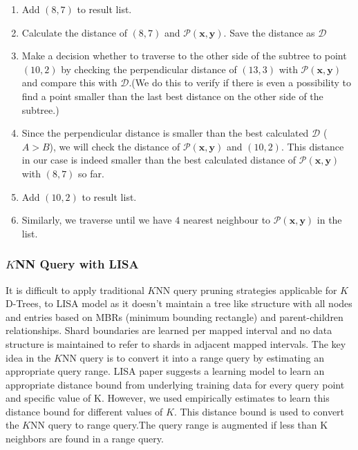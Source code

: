 \begin{mscexample}
\begin{enumerate}
    	\item Add $(8,7)$ to result list.
    	
    	\item Calculate the distance of $(8,7)$ and $\mathcal{P}(\boldsymbol{x}, \boldsymbol{y})$. Save the distance as $\mathcal{D}$
    	
    	\item Make a decision whether to traverse to the other side of the subtree to point $(10,2)$ by checking the perpendicular distance of $(13,3)$ with $\mathcal{P}(\boldsymbol{x}, \boldsymbol{y})$ and compare this with $\mathcal{D}$.(We do this to verify if there is even a possibility to find a point smaller than the last best distance on the other side of the subtree.) 
    	
    	\item Since the perpendicular distance is smaller than the best calculated $\mathcal{D}$ ($A > B$), we will check the distance of $\mathcal{P}(\boldsymbol{x}, \boldsymbol{y})$ and $(10,2)$. This distance in our case is indeed smaller than the best calculated distance of $\mathcal{P}(\boldsymbol{x}, \boldsymbol{y})$ with $(8,7)$ so far.
    	
    	\item Add $(10,2)$ to result list.
    	
    	\item Similarly, we traverse until we have $4$ nearest neighbour to $\mathcal{P}(\boldsymbol{x}, \boldsymbol{y})$ in the list.
	\end{enumerate}
\end{mscexample}



\subsubsection{$K$NN Query with LISA}
It is difficult to apply traditional $K$NN query pruning strategies applicable for $K$D-Trees, to LISA model as it doesn't maintain a tree like structure with all nodes and
entries based on MBRs (minimum bounding rectangle) and parent-children relationships. Shard boundaries are learned per mapped interval and no data structure is maintained to refer to shards in adjacent mapped intervals. The key idea in the $K$NN query is to convert it into a range query by estimating an appropriate query range. LISA paper suggests a learning model to learn an appropriate distance bound from underlying training data for every query point and specific value of K. However, we used empirically estimates to learn this distance bound for different values of $K$. This distance bound is used to convert the $K$NN query to range query.The query range is augmented if less than K neighbors are found in a range query. 

